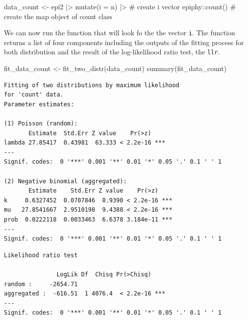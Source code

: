 \documentclass[
  letterpaper,
]{book}
\newenvironment{Shaded}{\begin{snugshade}}{\end{snugshade}}
\newcommand{\AttributeTok}[1]{\textcolor[rgb]{0.40,0.45,0.13}{#1}}
\newcommand{\CommentTok}[1]{\textcolor[rgb]{0.37,0.37,0.37}{#1}}
\newcommand{\FunctionTok}[1]{\textcolor[rgb]{0.28,0.35,0.67}{#1}}
\newcommand{\NormalTok}[1]{\textcolor[rgb]{0.00,0.23,0.31}{#1}}
\newcommand{\OtherTok}[1]{\textcolor[rgb]{0.00,0.23,0.31}{#1}}
\newcommand{\SpecialCharTok}[1]{\textcolor[rgb]{0.37,0.37,0.37}{#1}}
\begin{document}
\begin{Shaded}
\begin{Highlighting}[]
\NormalTok{data\_count }\OtherTok{\textless{}{-}}\NormalTok{ epi2 }\SpecialCharTok{|\textgreater{}} 
  \FunctionTok{mutate}\NormalTok{(}\AttributeTok{i =}\NormalTok{ n) }\SpecialCharTok{|\textgreater{}}  \CommentTok{\# create i vector}
\NormalTok{  epiphy}\SpecialCharTok{::}\FunctionTok{count}\NormalTok{()   }\CommentTok{\# create the map object of count class}
\end{Highlighting}
\end{Shaded}

We can now run the function that will look fo the the vector \texttt{i}.
The function returns a list of four components including the outputs of
the fitting process for both distribution and the result of the
log-likelihood ratio test, the \texttt{llr}.

\begin{Shaded}
\begin{Highlighting}[]
\NormalTok{fit\_data\_count }\OtherTok{\textless{}{-}} \FunctionTok{fit\_two\_distr}\NormalTok{(data\_count)}
\FunctionTok{summary}\NormalTok{(fit\_data\_count)}
\end{Highlighting}
\end{Shaded}

\begin{verbatim}
Fitting of two distributions by maximum likelihood
for 'count' data.
Parameter estimates:

(1) Poisson (random):
       Estimate  Std.Err Z value    Pr(>z)    
lambda 27.85417  0.43981  63.333 < 2.2e-16 ***
---
Signif. codes:  0 '***' 0.001 '**' 0.01 '*' 0.05 '.' 0.1 ' ' 1

(2) Negative binomial (aggregated):
       Estimate    Std.Err Z value    Pr(>z)    
k     0.6327452  0.0707846  8.9390 < 2.2e-16 ***
mu   27.8541667  2.9510198  9.4388 < 2.2e-16 ***
prob  0.0222118  0.0033463  6.6378 3.184e-11 ***
---
Signif. codes:  0 '***' 0.001 '**' 0.01 '*' 0.05 '.' 0.1 ' ' 1
\end{verbatim}

\begin{Shaded}
\end{Shaded}

\begin{verbatim}
Likelihood ratio test

               LogLik Df  Chisq Pr(>Chisq)    
random :     -2654.71                         
aggregated :  -616.51  1 4076.4  < 2.2e-16 ***
---
Signif. codes:  0 '***' 0.001 '**' 0.01 '*' 0.05 '.' 0.1 ' ' 1
\end{verbatim}
\end{document}
